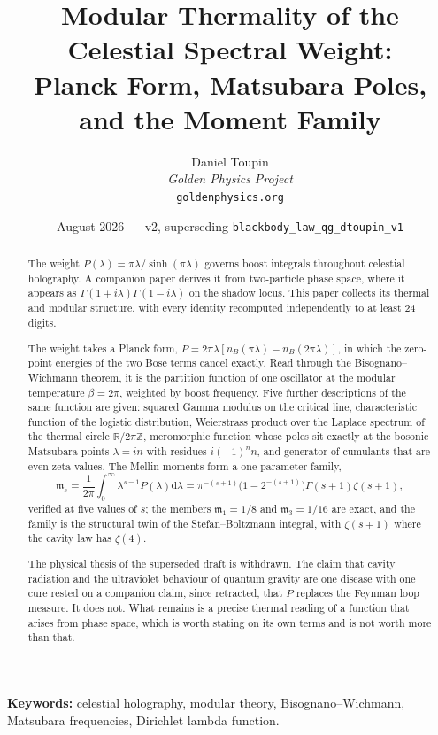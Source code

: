 \documentclass[12pt,a4paper]{article}
\title{Modular Thermality of the Celestial Spectral Weight:\\[4pt]
Planck Form, Matsubara Poles, and the Moment Family}
\author{Daniel Toupin\\[4pt]
\textit{Golden Physics Project}\\[2pt]
\texttt{goldenphysics.org}}
\date{August 2026 --- v2, superseding \texttt{blackbody\_law\_qg\_dtoupin\_v1}}
\theoremstyle{plain}
\theoremstyle{definition}
\theoremstyle{remark}
\newcommand{\R}{\mathbb{R}}
\newcommand{\Z}{\mathbb{Z}}
\newcommand{\dd}{\mathrm{d}}
\newcommand{\mm}{\mathfrak{m}}
\begin{document}
\maketitle

\begin{abstract}
\noindent
The weight $P(\lambda)=\pi\lambda/\sinh(\pi\lambda)$ governs boost
integrals throughout celestial holography. A companion paper derives it
from two-particle phase space, where it appears as
$\Gamma(1+i\lambda)\Gamma(1-i\lambda)$ on the shadow locus. This paper
collects its thermal and modular structure, with every identity
recomputed independently to at least 24 digits.

The weight takes a Planck form,
$P=2\pi\lambda[n_B(\pi\lambda)-n_B(2\pi\lambda)]$, in which the
zero-point energies of the two Bose terms cancel exactly. Read through
the Bisognano--Wichmann theorem, it is the partition function of one
oscillator at the modular temperature $\beta=2\pi$, weighted by boost
frequency. Five further descriptions of the same function are given:
squared Gamma modulus on the critical line, characteristic function of
the logistic distribution, Weierstrass product over the Laplace
spectrum of the thermal circle $\R/2\pi\Z$, meromorphic function whose
poles sit exactly at the bosonic Matsubara points $\lambda=in$ with
residues $i(-1)^n n$, and generator of cumulants that are even zeta
values. The Mellin moments form a one-parameter family,
\[
\mm_s=\frac{1}{2\pi}\int_0^\infty\lambda^{s-1}P(\lambda)\dd\lambda
=\pi^{-(s+1)}\bigl(1-2^{-(s+1)}\bigr)\Gamma(s+1)\zeta(s+1),
\]
verified at five values of $s$; the members $\mm_1=1/8$ and
$\mm_3=1/16$ are exact, and the family is the structural twin of the
Stefan--Boltzmann integral, with $\zeta(s+1)$ where the cavity law has
$\zeta(4)$.

The physical thesis of the superseded draft is withdrawn. The claim
that cavity radiation and the ultraviolet behaviour of quantum gravity
are one disease with one cure rested on a companion claim, since
retracted, that $P$ replaces the Feynman loop measure. It does not.
What remains is a precise thermal reading of a function that arises
from phase space, which is worth stating on its own terms and is not
worth more than that.
\end{abstract}

\medskip
\noindent\textbf{Keywords:} celestial holography, modular theory,
Bisognano--Wichmann, Matsubara frequencies, Dirichlet lambda function.

\tableofcontents
\newpage
\end{document}

